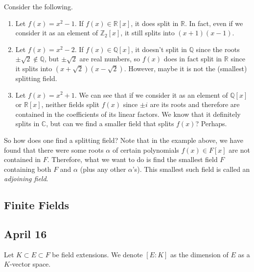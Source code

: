   \begin{example}
    Consider the following. 
    \begin{enumerate}
      \item Let $f(x) = x^2 - 1$. If $f(x) \in \mathbb{R}[x]$, it does split in $\mathbb{R}$. In fact, even if we consider it as an element of $\mathbb{Z}_2 [x]$, it still splits into $(x + 1)(x - 1)$. 
      \item Let $f(x) = x^2 - 2$. If $f(x) \in \mathbb{Q}[x]$, it doesn't split in $\mathbb{Q}$ since the roots $\pm \sqrt{2} \not\in \mathbb{Q}$, but $\pm \sqrt{2}$ are real numbers, so $f(x)$ does in fact split in $\mathbb{R}$ since it splits into $(x + \sqrt{2}) (x - \sqrt{2})$. However, maybe it is not the (smallest) splitting field. 
      \item Let $f(x) = x^2 + 1$. We can see that if we consider it as an element of $\mathbb{Q}[x]$ or $\mathbb{R}[x]$, neither fields split $f(x)$ since $\pm i$ are its roots and therefore are contained in the coefficients of its linear factors. We know that it definitely splits in $\mathbb{C}$, but can we find a smaller field that splits $f(x)$? Perhaps.  
    \end{enumerate}
  \end{example}

  So how does one find a splitting field? Note that in the example above, we have found that there were some roots $\alpha$ of certain polynomials $f(x) \in F[x]$ are not contained in $F$. Therefore, what we want to do is find the smallest field $F$ containing both $F$ and $\alpha$ (plus any other $\alpha$'s). This smallest such field is called an \textit{adjoining field}. 

\subsection{Finite Fields}

\subsection{April 16} 

  Let $K \subset E \subset F$ be field extensions. We denote $[E:K]$ as the dimension of $E$ as a $K$-vector space. 

